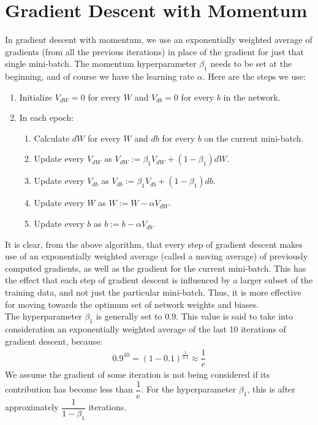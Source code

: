 \documentclass[a4paper, 12pt]{report}
\begin{document}
\section{Gradient Descent with Momentum}
In gradient descent with momentum, we use an exponentially weighted average of gradients (from all the previous iterations) in place of the gradient for just that single mini-batch. The momentum hyperparameter $\beta_1$ needs to be set at the beginning, and of course we have the learning rate $\alpha$. Here are the steps we use:
\begin{enumerate}
\item Initialize $V_{dW}=0$ for every $W$ and $V_{db}=0$ for every $b$ in the network.
\item In each epoch:
\begin{enumerate}
\item Calculate $dW$ for every $W$ and $db$ for every $b$ on the current mini-batch.
\item Update every $V_{dW}$ as $V_{dW} := \beta_1 V_{dW} + (1-\beta_1) dW$.
\item Update every $V_{db}$ as $V_{db} := \beta_1 V_{db} + (1-\beta_1) db$.
\item Update every $W$ as $W := W - \alpha V_{dW}$.
\item Update every $b$ as $b := b - \alpha V_{db}$.
\end{enumerate}
\end{enumerate}
It is clear, from the above algorithm, that every step of gradient descent makes use of an exponentially weighted average (called a moving average) of previously computed gradients, as well as the gradient for the current mini-batch. This has the effect that each step of gradient descent is influenced by a larger subset of the training data, and not just the particular mini-batch. Thus, it is more effective for moving towards the optimum set of network weights and biases.\\
\break
The hyperparameter $\beta_1$ is generally set to $0.9$. This value is said to take into consideration an exponentially weighted average of the last 10 iterations of gradient descent, because:
\begin{align*}
0.9^{10} = (1-0.1)^{\frac{1}{0.1}} \approx \dfrac{1}{e}
\end{align*}
We assume the gradient of some iteration is not being considered if its contribution has become less than $\dfrac{1}{e}$. For the hyperparameter $\beta_1$, this is after approximately $\dfrac{1}{1-\beta_1}$ iterations.
\end{document}

